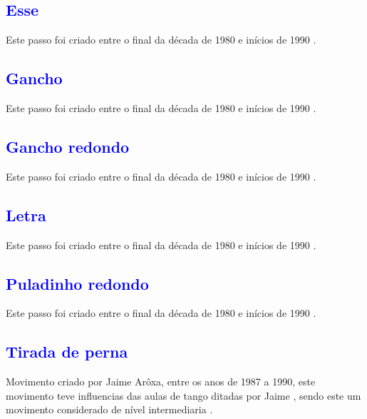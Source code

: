 \subsection{\textcolor{blue}{Esse}}
Este passo foi  criado entre o final da década de 1980 e inícios de 1990  \cite[pp. 143]{perna2002samba}.


\subsection{\textcolor{blue}{Gancho}} 
Este passo foi  criado entre o final da década de 1980 e inícios de 1990  \cite[pp. 143]{perna2002samba}.

\subsection{\textcolor{blue}{Gancho redondo}} 
Este passo foi  criado entre o final da década de 1980 e inícios de 1990  \cite[pp. 143]{perna2002samba}.

\subsection{\textcolor{blue}{Letra}}
Este passo foi  criado entre o final da década de 1980 e inícios de 1990  \cite[pp. 143]{perna2002samba}.

\subsection{\textcolor{blue}{Puladinho redondo}} 
Este passo foi  criado entre o final da década de 1980 e inícios de 1990  \cite[pp. 143]{perna2002samba}.


\subsection{\textcolor{blue}{Tirada de perna}}
Movimento criado por Jaime Arôxa, entre os anos de 1987 a 1990,
este movimento teve influencias das aulas de tango ditadas por Jaime \cite{EntrevistaJaimeAroxa1},
sendo este um movimento considerado de nível intermediaria \cite[pp. 144]{perna2002samba}.



